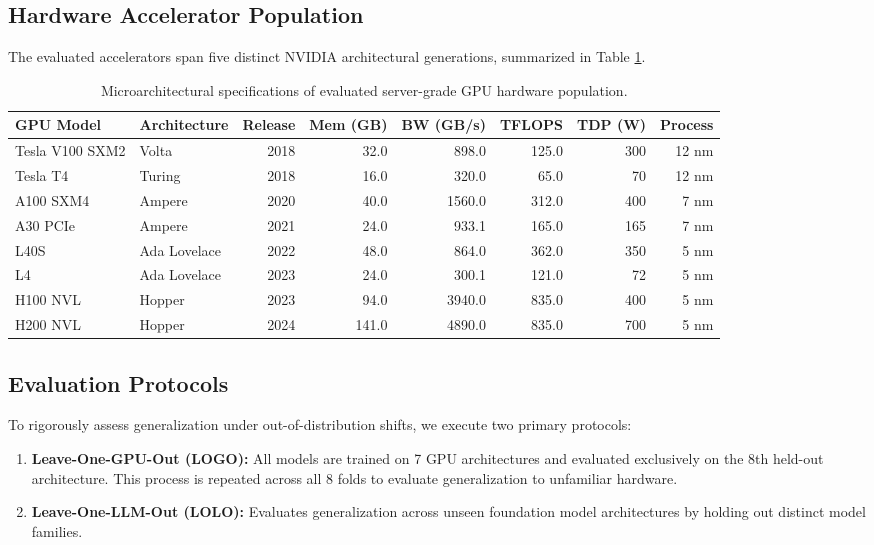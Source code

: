 \documentclass[3p,12pt]{elsarticle}
\begin{document}
\subsection{Hardware Accelerator Population}
The evaluated accelerators span five distinct NVIDIA architectural generations, summarized in Table \ref{tab:hardware_specs}.

\begin{table}[h]
\centering
\caption{Microarchitectural specifications of evaluated server-grade GPU hardware population.}
\label{tab:hardware_specs}
\small
\begin{tabularx}{\textwidth}{llrrrrrr}
\toprule
\textbf{GPU Model} & \textbf{Architecture} & \textbf{Release} & \textbf{Mem (GB)} & \textbf{BW (GB/s)} & \textbf{TFLOPS} & \textbf{TDP (W)} & \textbf{Process} \\
\midrule
Tesla V100 SXM2 & Volta & 2018 & 32.0 & 898.0 & 125.0 & 300 & 12 nm \\
Tesla T4 & Turing & 2018 & 16.0 & 320.0 & 65.0 & 70 & 12 nm \\
A100 SXM4 & Ampere & 2020 & 40.0 & 1560.0 & 312.0 & 400 & 7 nm \\
A30 PCIe & Ampere & 2021 & 24.0 & 933.1 & 165.0 & 165 & 7 nm \\
L40S & Ada Lovelace & 2022 & 48.0 & 864.0 & 362.0 & 350 & 5 nm \\
L4 & Ada Lovelace & 2023 & 24.0 & 300.1 & 121.0 & 72 & 5 nm \\
H100 NVL & Hopper & 2023 & 94.0 & 3940.0 & 835.0 & 400 & 5 nm \\
H200 NVL & Hopper & 2024 & 141.0 & 4890.0 & 835.0 & 700 & 5 nm \\
\bottomrule
\end{tabularx}
\end{table}

\subsection{Evaluation Protocols}
To rigorously assess generalization under out-of-distribution shifts, we execute two primary protocols:
\begin{enumerate}
    \item \textbf{Leave-One-GPU-Out (LOGO):} All models are trained on 7 GPU architectures and evaluated exclusively on the 8th held-out architecture. This process is repeated across all 8 folds to evaluate generalization to unfamiliar hardware.
    \item \textbf{Leave-One-LLM-Out (LOLO):} Evaluates generalization across unseen foundation model architectures by holding out distinct model families.
\end{enumerate}
\end{document}
